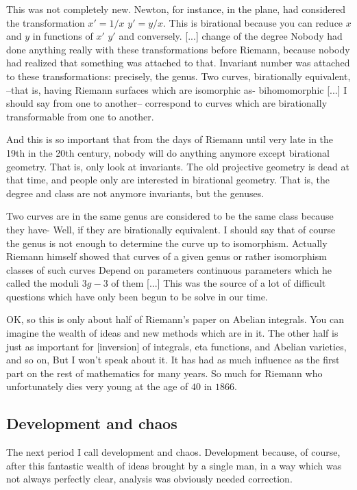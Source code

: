 \documentclass{article}
\begin{document}
This was not completely new. Newton, for instance, in the plane, 
had considered the transformation $x' = 1/x$  $y'=y/x$.
This is birational because you can reduce $x$ and $y$ in functions of $x'$ $y'$ and conversely.
[...] change of the degree
Nobody had done anything really 
with these transformations before Riemann,
because nobody had realized 
that something was attached to that.
Invariant number was attached to these transformations:
precisely, the genus.
Two curves, birationally equivalent,
--that is, having Riemann surfaces 
which are isomorphic as- bihomomorphic 
[...] I should say from one to another--
correspond to curves which are birationally transformable 
from one to another.

And this is so important that from the days of Riemann 
until very late in the 19th in the 20th century,
nobody will do anything anymore except birational geometry.
That is, only look at invariants.
The old projective geometry is dead at that time,
and people only are interested in birational geometry.
That is, the degree and class are not anymore invariants, 
but the genuses.

Two curves are in the same genus 
are considered to be the same class because they have-
Well, if they are birationally equivalent.
I should say that of course the genus is not enough 
to determine the curve up to isomorphism.
Actually Riemann himself showed that curves of a given genus or rather isomorphism classes of such curves
Depend on parameters continuous parameters which he called the moduli
$3g-3$ of them [...] 
This was the source of a lot of difficult questions which have only been begun to be solve in our time.

OK, so this is only about half 
of Riemann's paper on Abelian integrals.
You can imagine the wealth of ideas and new methods which are in it.
The other half is just as important 
for [inversion] of integrals,
eta functions, and Abelian varieties, and so on,
But I won't speak about it.
It has had as much influence 
as the first part 
on the rest of mathematics for many years.
So much for Riemann who unfortunately dies 
very young at the age of $40$ in $1866$.

\subsection{Development and chaos}
The next period I call development and chaos.
Development because, of course,
after this fantastic wealth of ideas 
brought by a single man,
in a way which was not always perfectly clear,
analysis was obviously needed correction.
\end{document}
